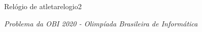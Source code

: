 \documentclass[12pt,a4paper,oneside]{article}
\begin{document}
\begin{problem}{Relógio de atleta}{relogio}{2}

\Example

\begin{example}
%
\end{example}

\begin{example}
%
\end{example}

\begin{example}
%
\end{example}

\begin{example}
%
\end{example}


\footnotesize \textit{Problema da OBI 2020 - Olimpíada Brasileira de Informática}

\end{problem}
\end{document}
